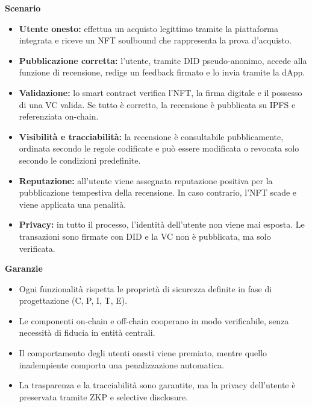             \noindent \textbf{Scenario}
            \begin{itemize}
                \item \textbf{Utente onesto:} effettua un acquisto legittimo tramite la piattaforma integrata e riceve un NFT soulbound che rappresenta la prova d'acquisto.

                \item \textbf{Pubblicazione corretta:} l'utente, tramite DID pseudo-anonimo, accede alla funzione di recensione, redige un feedback firmato e lo invia tramite la dApp.

                \item \textbf{Validazione:} lo smart contract verifica l’NFT, la firma digitale e il possesso di una VC valida. Se tutto è corretto, la recensione è pubblicata su IPFS e referenziata on-chain.

                \item \textbf{Visibilità e tracciabilità:} la recensione è consultabile pubblicamente, ordinata secondo le regole codificate e può essere modificata o revocata solo secondo le condizioni predefinite.

                \item \textbf{Reputazione:} all'utente viene assegnata reputazione positiva per la pubblicazione tempestiva della recensione. In caso contrario, l’NFT scade e viene applicata una penalità.

                \item \textbf{Privacy:} in tutto il processo, l'identità dell'utente non viene mai esposta. Le transazioni sono firmate con DID e la VC non è pubblicata, ma solo verificata.
            \end{itemize}

            \noindent \textbf{Garanzie}
            \begin{itemize}
                \item Ogni funzionalità rispetta le proprietà di sicurezza definite in fase di progettazione (C, P, I, T, E).

                \item Le componenti on-chain e off-chain cooperano in modo verificabile, senza necessità di fiducia in entità centrali.

                \item Il comportamento degli utenti onesti viene premiato, mentre quello inadempiente comporta una penalizzazione automatica.

                \item La trasparenza e la tracciabilità sono garantite, ma la privacy dell'utente è preservata tramite ZKP e selective disclosure.
            \end{itemize}

